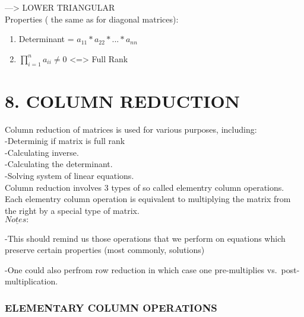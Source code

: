 \documentclass[]{article}
\providecommand{\tightlist}{%
  \setlength{\itemsep}{0pt}\setlength{\parskip}{0pt}}
\begin{document}
---\textgreater{} LOWER TRIANGULAR\\

Properties ( the same as for diagonal matrices):

\begin{enumerate}
\def\labelenumi{\alph{enumi})}
\tightlist
\item
  Determinant = \(a_{11}*a_{22}*...*a_{nn}\)\\
\item
  \(\prod_{i=1}^{n}a_{ii} \neq 0\) \textless{}=\textgreater{} Full
  Rank\\
\end{enumerate}

\section{\texorpdfstring{8. COLUMN REDUCTION\\
}{8. COLUMN REDUCTION }}\label{column-reduction}

Column reduction of matrices is used for various purposes, including:\\

-Determinig if matrix is full rank\\[2\baselineskip] -Calculating
inverse.\\[2\baselineskip] -Calculating the
determinant.\\[2\baselineskip] -Solving system of linear equations.\\

Column reduction involves 3 types of so called elementry column
operations.\\

Each elementry column operation is equivalent to multiplying the matrix
from the right by a special type of matrix.\\

\(\underline{Notes:}\)

-This should remind us those operations that we perform on equations
which preserve certain properties (most commonly, solutions)

-One could also perfrom row reduction in which case one pre-multiplies
vs.~post-multiplication.\\

\subsubsection{\texorpdfstring{ELEMENTARY COLUMN OPERATIONS\\
}{ELEMENTARY COLUMN OPERATIONS }}\label{elementary-column-operations}
\end{document}
